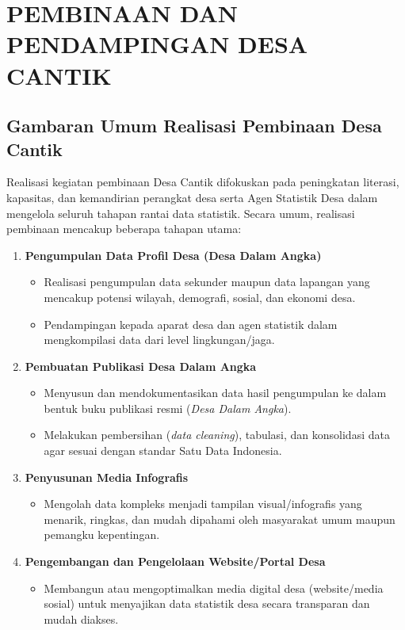 
\chapter{PEMBINAAN DAN PENDAMPINGAN DESA CANTIK}

\section{Gambaran Umum Realisasi Pembinaan Desa Cantik}

Realisasi kegiatan pembinaan Desa Cantik difokuskan pada peningkatan literasi, kapasitas, dan kemandirian perangkat desa serta Agen Statistik Desa dalam mengelola seluruh tahapan rantai data statistik. Secara umum, realisasi pembinaan mencakup beberapa tahapan utama:

\begin{enumerate}[label=\textbf{\arabic*.}]
  \item \textbf{Pengumpulan Data Profil Desa (Desa Dalam Angka)}
  \begin{itemize}
    \item Realisasi pengumpulan data sekunder maupun data lapangan yang mencakup potensi wilayah, demografi, sosial, dan ekonomi desa.
    \item Pendampingan kepada aparat desa dan agen statistik dalam mengkompilasi data dari level lingkungan/jaga.
  \end{itemize}

  \item \textbf{Pembuatan Publikasi Desa Dalam Angka}
  \begin{itemize}
    \item Menyusun dan mendokumentasikan data hasil pengumpulan ke dalam bentuk buku publikasi resmi (\textit{Desa Dalam Angka}).
    \item Melakukan pembersihan (\textit{data cleaning}), tabulasi, dan konsolidasi data agar sesuai dengan standar Satu Data Indonesia.
  \end{itemize}

  \item \textbf{Penyusunan Media Infografis}
  \begin{itemize}
    \item Mengolah data kompleks menjadi tampilan visual/infografis yang menarik, ringkas, dan mudah dipahami oleh masyarakat umum maupun pemangku kepentingan.
  \end{itemize}

  \item \textbf{Pengembangan dan Pengelolaan Website/Portal Desa}
  \begin{itemize}
    \item Membangun atau mengoptimalkan media digital desa (website/media sosial) untuk menyajikan data statistik desa secara transparan dan mudah diakses.
  \end{itemize}
\end{enumerate}

